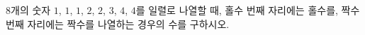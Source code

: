 $8$개의 숫자 $1$, $1$, $1$, $2$, $2$, $3$, $4$, $4$를 일렬로 나열할 때, 홀수 번째 자리에는 홀수를, 짝수 번째 자리에는 짝수를 나열하는 경우의 수를 구하시오.
